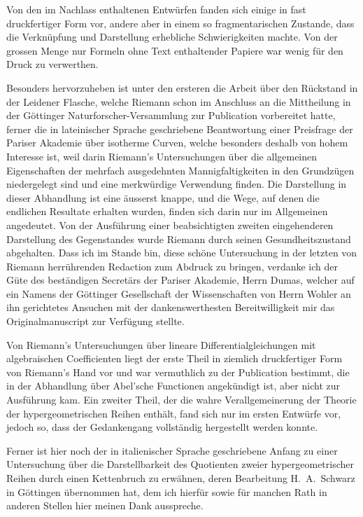 \documentclass[12pt,a4paper]{book}
\theoremstyle{definition}
\theoremstyle{remark}
\begin{document}
Von den im Nachlass enthaltenen Entw\"urfen fanden sich einige in fast druckfertiger Form vor, andere aber in einem so fragmentarischen Zustande, dass die Verkn\"upfung und Darstellung erhebliche Schwierigkeiten machte. Von der grossen Menge nur Formeln ohne Text enthaltender Papiere war wenig f\"ur den Druck zu verwerthen.

Besonders hervorzuheben ist unter den ersteren die Arbeit \"uber den R\"uckstand in der Leidener Flasche, welche Riemann schon im Anschluss an die Mittheilung in der G\"ottinger Naturforscher-Versammlung zur Publication vorbereitet hatte, ferner die in lateinischer Sprache geschriebene Beantwortung einer Preisfrage der Pariser Akademie \"uber isotherme Curven, welche besonders deshalb von hohem Interesse ist, weil darin Riemann's Untersuchungen \"uber die allgemeinen Eigenschaften der mehrfach ausgedehnten Mannigfaltigkeiten in den Grundz\"ugen niedergelegt sind und eine merkw\"urdige Verwendung finden. Die Darstellung in dieser Abhandlung ist eine \"ausserst knappe, und die Wege, auf denen die endlichen Resultate erhalten wurden, finden sich darin nur im Allgemeinen angedeutet. Von der Ausf\"uhrung einer beabsichtigten zweiten eingehenderen Darstellung des Gegenstandes wurde Riemann durch seinen Gesundheitszustand abgehalten. Dass ich im Stande bin, diese sch\"one Untersuchung in der letzten von Riemann herr\"uhrenden Redaction zum Abdruck zu bringen, verdanke ich der G\"ute des best\"andigen Secret\"ars der Pariser Akademie, Herrn Dumas, welcher auf ein Namens der G\"ottinger Gesellschaft der Wissenschaften von Herrn Wohler an ihn gerichtetes Ansuchen mit der dankenswerthesten Bereitwilligkeit mir das Originalmanuscript zur Verf\"ugung stellte.

Von Riemann's Untersuchungen \"uber lineare Differentialgleichungen mit algebraischen Coefficienten liegt der erste Theil in ziemlich druckfertiger Form von Riemann's Hand vor und war vermuthlich zu der Publication bestimmt, die in der Abhandlung \"uber Abel'sche Functionen angek\"undigt ist, aber nicht zur Ausf\"uhrung kam. Ein zweiter Theil, der die wahre Verallgemeinerung der Theorie der hypergeometrischen Reihen enth\"alt, fand sich nur im ersten Entw\"urfe vor, jedoch so, dass der Gedankengang vollst\"andig hergestellt werden konnte.

\clearpage

Ferner ist hier noch der in italienischer Sprache geschriebene Anfang zu einer Untersuchung \"uber die Darstellbarkeit des Quotienten zweier hypergeometrischer Reihen durch einen Kettenbruch zu erw\"ahnen, deren Bearbeitung H.\ A.\ Schwarz in G\"ottingen \"ubernommen hat, dem ich hierf\"ur sowie f\"ur manchen Rath in anderen Stellen hier meinen Dank ausspreche.
\end{document}
